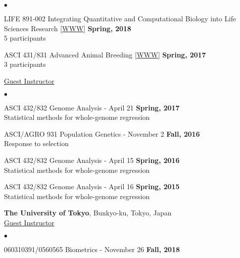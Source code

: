 \documentclass[margin,line,10pt]{res}
\newenvironment{list2}{
  \begin{list}{$\bullet$}{%
      \setlength{\itemsep}{0in}
      \setlength{\parsep}{0in} \setlength{\parskip}{0in}
      \setlength{\topsep}{0in} \setlength{\partopsep}{0in} 
      \setlength{\leftmargin}{0.2in}}}{\end{list}}
\begin{document}
\begin{resume}
\begin{list2}
  \vspace{0.5cm}

\item LIFE 891-002 Integrating Quantitative and Computational Biology into Life Sciences Research [\textcolor{blue}{\href{http://morotalab.org/life431-2018/life431-831.html}{WWW}}]
  \hfill {\bf Spring, 2018}  \\
 5 participants  

 \vspace{0.5cm}

\item ASCI 431/831 Advanced Animal Breeding [\textcolor{blue}{\href{http://morotalab.org/asci431-2017/ASCI431-831.html}{WWW}}]
  \hfill {\bf Spring, 2017}  \\
 3 participants 
\end{list2}

 \vspace{.01pt}

\underline{Guest Instructor}
 \vspace{0.4cm}
 \begin{list2}
 \item ASCI 432/832 Genome Analysis - April 21  \hfill {\bf Spring, 2017} \\
   Statistical methods for whole-genome regression
\vspace{0.5cm}
\item ASCI/AGRO 931  Population Genetics - November 2  \hfill {\bf Fall, 2016} \\
  Response to selection
\vspace{0.5cm}
\item ASCI 432/832 Genome Analysis - April 15  \hfill {\bf Spring, 2016} \\
  Statistical methods for whole-genome regression
\vspace{0.5cm}
\item ASCI 432/832 Genome Analysis - April 16    \hfill {\bf Spring, 2015} \\
  Statistical methods for whole-genome regression
\end{list2}


  \vspace{1cm}

{\bf The University of Tokyo}, Bunkyo-ku, Tokyo, Japan \vspace{0.2cm} \\
\underline{Guest Instructor}
\vspace{0.4cm}
 \begin{list2}
 \item 060310391/0560565 Biometrics - November 26 \hfill {\bf Fall, 2018}
 \end{list2}



\end{resume}
\end{document}
